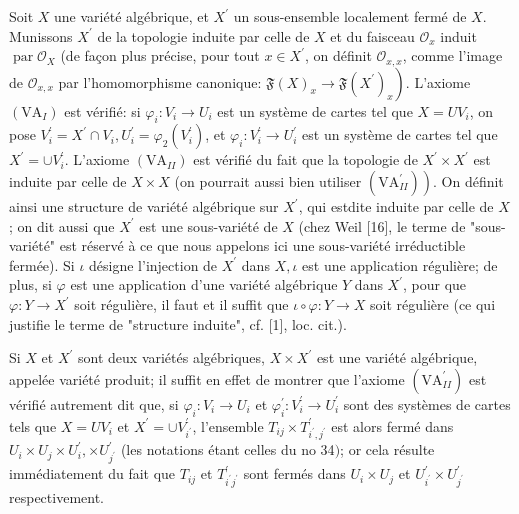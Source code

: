 Soit $X$ une variété algébrique, et $X^{\prime}$ un sous-ensemble localement fermé de $X$. Munissons $X^{\prime}$ de la topologie induite par celle de $X$ et du faisceau $\mathcal{O}_{x}$ induit $\operatorname{par} \mathcal{O}_{X}$ (de façon plus précise, pour tout $x \in X^{\prime}$, on définit $\mathcal{O}_{x, x}$, comme l'image de $\mathcal{O}_{x, x}$ par l'homomorphisme canonique: $\left.\mathfrak{F}(X)_{x} \rightarrow \mathfrak{F}\left(X^{\prime}\right)_{x}\right) .$ L'axiome $\left(\mathrm{VA}_{I}\right)$ est vérifié: si $\varphi_{i}: V_{i} \rightarrow U_{i}$ est un système de cartes tel que $X=U V_{i}$, on pose $V_{i}^{\prime}=X^{\prime} \cap V_{i}, U_{i}^{\prime}=\varphi_{2}\left(V_{i}^{\prime}\right)$, et $\varphi_{i}: V_{i}^{\prime} \rightarrow U_{i}^{\prime}$ est un système de cartes tel que $X^{\prime}=\cup V_{i}^{\prime} .$ L'axiome $\left(\mathrm{VA}_{I I}\right)$ est vérifié du fait que la topologie de $X^{\prime} \times X^{\prime}$ est induite par celle de $X \times X$ (on pourrait aussi bien utiliser $\left.\left(\mathrm{VA}_{I I}^{\prime}\right)\right)$. On définit ainsi une structure de variété algébrique sur $X^{\prime}$, qui estdite induite par celle de $X$; on dit aussi que $X^{\prime}$ est une sous-variété de $X$ (chez Weil [16], le terme de "sous-variété" est réservé à ce que nous appelons ici une sous-variété irréductible fermée). Si $\iota$ désigne l'injection de $X^{\prime}$ dans $X, \iota$ est une application régulière; de plus, si $\varphi$ est une application d'une variété algébrique $Y$ dans $X^{\prime}$, pour que $\varphi: Y \rightarrow X^{\prime}$ soit régulière, il faut et il suffit que $\iota \circ \varphi: Y \rightarrow X$ soit régulière (ce qui justifie le terme de "structure induite", cf. [1], loc. cit.).

Si $X$ et $X^{\prime}$ sont deux variétés algébriques, $X \times X^{\prime}$ est une variété algébrique, appelée variété produit; il suffit en effet de montrer que l'axiome $\left(\mathrm{VA}_{I I}^{\prime}\right)$ est vérifié autrement dit que, si $\varphi_{i}: V_{i} \rightarrow U_{i}$ et $\varphi_{i}^{\prime}: V_{i}^{\prime} \rightarrow U_{i}^{\prime}$ sont des systèmes de cartes tels que $X=U V_{i}$ et $X^{\prime}=\cup V_{i^{\prime}}^{\prime}$, l'ensemble $T_{i j} \times T_{i^{\prime}, j^{\prime}}^{\prime}$ est alors fermé dans $U_{i} \times U_{j} \times U_{i}^{\prime}, \times U_{j^{\prime}}^{\prime}$ (les notations étant celles du no 34$)$; or cela résulte immédiatement du fait que $T_{i j}$ et $T_{i^{\prime} j^{\prime}}^{\prime}$ sont fermés dans $U_{i} \times U_{j}$ et $U_{i^{\prime}}^{\prime} \times U_{j^{\prime}}^{\prime}$ respectivement.

